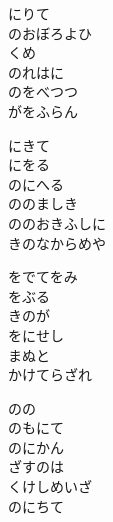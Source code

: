 \documentclass[10pt,b5j]{tarticle} %
\begin{document}
\vspace{1.5em} %
\newcommand{\linespace}{0.5em} %
\newcommand{\blocksize}{0.5\hsize} %
\begin{enumerate} %
    \begin{minipage}[c]{\blocksize}
    
        \vspace{\linespace}
        \item
        にりて\\
        のおぼろよひ\\
        くめ\\
        のれはに\\
        のをべつつ\\
        がをふらん
        
        \vspace{\linespace}
        \item
        にきて\\
        にをる\\
        のにへる\\
        ののましき\\
        ののおきふしに\\
        きのなからめや
        
        \vspace{\linespace}
        \item
        をでてをみ\\
        をぶる\\
        きのが\\
        をにせし\\
        まぬと\\
        かけてらざれ
        
        \vspace{\linespace}
        \item
        のの\\
        のもにて\\
        のにかん\\
        ざすのは\\
        くけしめいざ\\
        のにちて
        

\end{minipage}
\end{enumerate}
\end{document}
